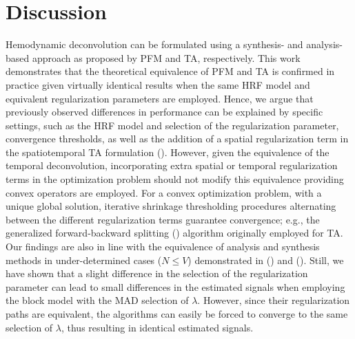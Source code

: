 
\section{Discussion}

Hemodynamic deconvolution can be formulated using a synthesis- and analysis-based approach as proposed by PFM and TA, respectively. This work demonstrates that the theoretical equivalence of PFM and TA is confirmed in practice given virtually identical results when the same HRF model and equivalent regularization parameters are employed. Hence, we argue that previously observed differences in performance can be explained by specific settings, such as the HRF model and selection of the regularization parameter, convergence thresholds, as well as the addition of a spatial regularization term in the spatiotemporal TA formulation (\citealt{Karahanoglu2013TotalactivationfMRI}). However, given the equivalence of the temporal deconvolution, incorporating extra spatial or temporal regularization terms in the optimization problem should not modify this equivalence providing convex operators are employed. For a convex optimization problem, with a unique global solution, iterative shrinkage thresholding procedures alternating between the different regularization terms guarantee convergence; e.g., the generalized forward-backward splitting (\citealt{Raguet2013GeneralizedForwardBackward}) algorithm originally employed for TA. Our findings are also in line with the equivalence of analysis and synthesis methods in under-determined cases (\(N \leq V\)) demonstrated in (\citealt{Elad2007Analysisversussynthesis}) and (\citealt{ortelli2019synthesis}). Still, we have shown that a slight difference in the selection of the regularization parameter can lead to small differences in the estimated signals when employing the block model with the MAD selection of $\lambda$. However, since their regularization paths are equivalent, the algorithms can easily be forced to converge to the same selection of $\lambda$, thus resulting in identical estimated signals.

